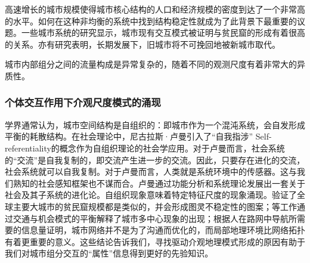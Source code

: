 高速增长的城市规模使得城市核心结构的人口和经济规模的密度到达了一个非常高的水平。如何在这种非均衡的系统中找到结构稳定性就成为了此背景下最重要的议题。一些城市系统的研究显示，城市现有交互模式被证明与贫民窟的形成有着很高的关系\cite{brelsford2018toward}。亦有研究表明，长期发展下，旧城市将不可挽回地被新城市取代\cite{fujita1997structural, cottineau2017diverse}。


城市内部组分之间的流量构成是异常复杂的，随着不同的观测尺度有着非常大的异质性\cite{masucci2013gravity}。


\subsubsection{个体交互作用下介观尺度模式的涌现}

学界通常认为，城市空间结构是自组织的：即城市作为一个混沌系统，会自发形成平衡的耗散结构。在社会理论中，尼古拉斯·卢曼引入了“自我指涉” Self-referentiality的概念作为自组织理论的社会学应用\cite{luhmann1984soziale}。对于卢曼而言，社会系统的“交流”是自我复制的，即交流产生进一步的交流。因此，只要存在进化的交流，社会系统就可以自我复制。对于卢曼而言，人类就是系统环境中的传感器。这与我们熟知的社会感知框架也不谋而合。卢曼通过功能分析和系统理论发展出一套关于社会及其子系统的进化论。自组织现象意味着特定特征尺度的现象涌现。\cite{friesen2018similar, pelz2019similar}验证了全球主要大城市的贫民窟规模都是类似的，并会形成图灵不稳定性的图案；\cite{louf2013modeling, courtat2011mathematics}等工作通过交通与机会模式的平衡解释了城市多中心现象的出现；\cite{rosvall2005networks}根据人在路网中导航所需要的信息量证明，城市网络并不是为了沟通而优化的，而局部地理环境比网络拓扑有着更重要的意义。这些结论告诉我们，寻找驱动介观地理模式形成的原因有助于我们对城市组分交互的“属性”信息得到更好的先验知识。

